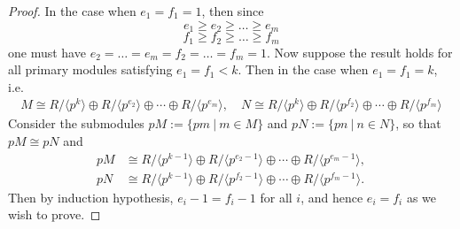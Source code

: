 \documentclass[11pt,openany]{book}
\theoremstyle{plain}
\theoremstyle{definition}
\theoremstyle{remark}
\begin{document}
\begin{proof}
In the case when $e_1 = f_1 = 1$, then since
$$e_1 \geq e_2 \geq \dots \geq e_m$$
$$f_1 \geq f_2 \geq \dots \geq f_m$$
one must have $e_2 = \dots = e_m = f_2 = \dots = f_m = 1$. Now suppose the result holds for all primary modules satisfying $e_1 = f_1 < k$. Then in the case when $e_1 = f_1 = k$, i.e.
    \begin{align*}
        M \cong R/\langle p^k \rangle \oplus R/\langle p^{e_2} \rangle \oplus \cdots\oplus R/\langle p^{e_m} \rangle,
        \quad N \cong R/\langle p^k \rangle \oplus R/\langle p^{f_2} \rangle \oplus \cdots\oplus R/\langle p^{f_m} \rangle
    \end{align*}
Consider the submodules $pM := \{pm\ |\ m \in M\}$ and $pN := \{pn\ |\ n \in N\}$, so that $pM \cong pN$ and
\begin{align*}
        pM &\cong R/\langle p^{k-1} \rangle \oplus R/\langle p^{e_2-1} \rangle \oplus \cdots\oplus R/\langle p^{e_m-1} \rangle,\\
        pN &\cong R/\langle p^{k-1} \rangle \oplus R/\langle p^{f_2-1} \rangle \oplus \cdots\oplus R/\langle p^{f_m-1} \rangle.
    \end{align*}
Then by induction hypothesis, $e_i -1 = f_i -1$ for all $i$, and hence $e_i = f_i$ as we wish to prove.
\end{proof}
\end{document}
